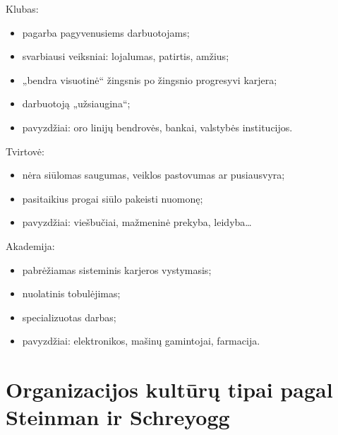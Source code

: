 Klubas:
\begin{itemize}
  \item pagarba pagyvenusiems darbuotojams;
  \item svarbiausi veiksniai: lojalumas, patirtis, amžius;
  \item „bendra visuotinė“ žingsnis po žingsnio progresyvi karjera;
  \item darbuotoją „užsiaugina“;
  \item pavyzdžiai: oro linijų bendrovės, bankai, valstybės institucijos.
\end{itemize}

Tvirtovė:
\begin{itemize}
  \item nėra siūlomas saugumas, veiklos pastovumas ar pusiausvyra;
  \item pasitaikius progai siūlo pakeisti nuomonę;
  \item pavyzdžiai: viešbučiai, mažmeninė prekyba, leidyba…
\end{itemize}

Akademija:
\begin{itemize}
  \item pabrėžiamas sisteminis karjeros vystymasis;
  \item nuolatinis tobulėjimas;
  \item specializuotas darbas;
  \item pavyzdžiai: elektronikos, mašinų gamintojai, farmacija.
\end{itemize}

\section{Organizacijos kultūrų tipai pagal Steinman ir Schreyogg}

